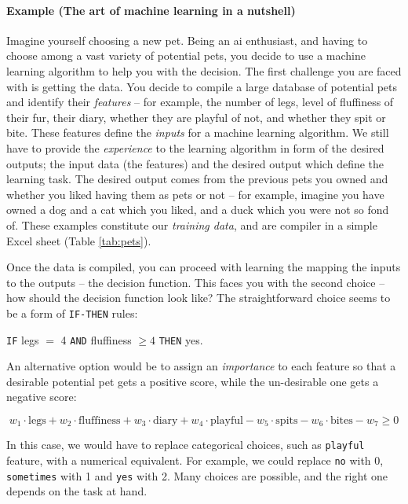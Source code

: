 \paragraph{Example (The art of machine learning in a nutshell)} Imagine yourself choosing a new pet.
Being an \gls{ai} enthusiast, and having to choose among a vast variety of potential pets, you decide to use a machine learning algorithm to help you with the decision.
The first challenge you are faced with  is getting the data.
You decide to compile a large database of potential pets and identify their \textit{features} -- for example, the number of legs, level of fluffiness of their fur, their diary, whether they are playful of not, and whether they spit or bite.
These features define the \textit{inputs} for a machine learning algorithm.
We still have to provide the \textit{experience} to the learning algorithm in form of the desired outputs; the input data (the features) and the desired output which define the learning task.
The desired output comes from the previous pets you owned and whether you liked having them as pets or not -- for example, imagine you have owned a dog and a cat which you liked, and a duck which you were not so fond of.
These examples constitute our \textit{training data}, and are compiler in a simple Excel sheet (Table \ref{tab:pets}).



Once the data is compiled, you can proceed with learning the  mapping the inputs to the outputs -- the decision function.
This faces you with the second choice -- how should the decision function look like?
The straightforward choice seems to be a form of \texttt{IF-THEN} rules:
\begin{center}
	\texttt{IF} legs $=$ 4 \texttt{AND} fluffiness $\geq 4$ \texttt{THEN} yes.
\end{center}
An alternative option would be to assign an \textit{importance} to each feature so that a desirable potential pet gets a positive score, while the un-desirable one gets a negative score:

$$ w_1 \cdot \text{legs} + w_2 \cdot \text{fluffiness} + w_3 \cdot \text{diary} + w_4 \cdot \text{playful} - w_5 \cdot \text{spits} - w_6 \cdot \text{bites} - w_7 \geq 0$$

In this case, we would have to replace categorical choices, such as \texttt{playful} feature, with a numerical equivalent.
For example, we could replace \texttt{no} with 0, \texttt{sometimes} with 1 and \texttt{yes} with 2.
Many choices are possible, and the right one depends on the task at hand.


